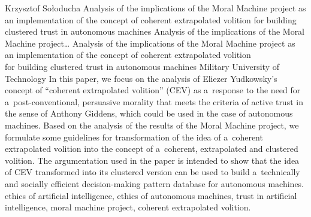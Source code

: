 \begin{artengenv}{Krzysztof Sołoducha}
	{Analysis of the implications of the Moral Machine project as an implementation of the concept of coherent extrapolated volition for building clustered trust in autonomous machines}
	{Analysis of the implications of the Moral Machine project\ldots}
	{Analysis of the implications of the Moral Machine project as\\an implementation of the concept of coherent extrapolated volition\\for building clustered trust in autonomous machines}
	{Military University of Technology}
	{In this paper, we focus on the analysis of Eliezer Yudkowsky's concept of ``coherent extrapolated volition'' (CEV) as a~response to the need for a~post-conventional, persuasive morality that meets the criteria of active trust in the sense of Anthony Giddens, which could be used in the case of autonomous machines. Based on the analysis of the results of the Moral Machine project, we formulate some guidelines for transformation of the idea of a~coherent extrapolated volition into the concept of a~coherent, extrapolated and clustered volition. The argumentation used in the paper is intended to show that the idea of CEV transformed into its clustered version can be used to build a~technically and socially efficient decision-making pattern database for autonomous machines.
	}
	{ethics of artificial intelligence, ethics of autonomous machines, trust in artificial intelligence, moral machine project, coherent extrapolated volition.}
	

\end{artengenv}
